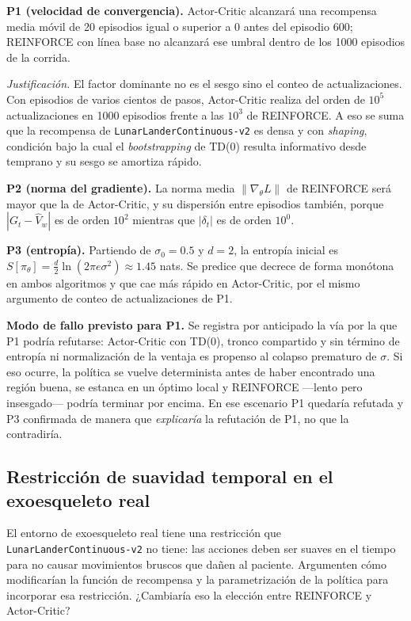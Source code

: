 \documentclass[11pt,letterpaper]{article}
\newcommand{\lead}[1]{\textbf{#1}}
\begin{document}
\begin{prediccion}
\lead{P1 (velocidad de convergencia).} Actor-Critic alcanzará una recompensa media móvil
de 20 episodios igual o superior a $0$ antes del episodio $600$; REINFORCE con línea base
no alcanzará ese umbral dentro de los 1000 episodios de la corrida.

\emph{Justificación.} El factor dominante no es el sesgo sino el conteo de
actualizaciones. Con episodios de varios cientos de pasos, Actor-Critic realiza del orden
de $10^5$ actualizaciones en 1000 episodios frente a las $10^3$ de REINFORCE. A eso se
suma que la recompensa de \texttt{LunarLanderContinuous-v2} es densa y con
\textit{shaping}, condición bajo la cual el \textit{bootstrapping} de TD(0) resulta
informativo desde temprano y su sesgo se amortiza rápido.

\medskip
\lead{P2 (norma del gradiente).} La norma media $\lVert\nabla_\theta L\rVert$ de REINFORCE
será mayor que la de Actor-Critic, y su dispersión entre episodios también, porque
$|G_t - \hat{V}_w|$ es de orden $10^2$ mientras que $|\delta_t|$ es de orden $10^0$.

\medskip
\lead{P3 (entropía).} Partiendo de $\sigma_0 = 0.5$ y $d=2$, la entropía inicial es
$S[\pi_\theta] = \tfrac{d}{2}\ln(2\pi e\sigma^2) \approx 1.45$ nats. Se predice que
decrece de forma monótona en ambos algoritmos y que cae más rápido en Actor-Critic, por
el mismo argumento de conteo de actualizaciones de P1.

\medskip
\lead{Modo de fallo previsto para P1.} Se registra por anticipado la vía por la que P1
podría refutarse: Actor-Critic con TD(0), tronco compartido y sin término de entropía ni
normalización de la ventaja es propenso al colapso prematuro de $\sigma$. Si eso ocurre,
la política se vuelve determinista antes de haber encontrado una región buena, se estanca
en un óptimo local y REINFORCE —lento pero insesgado— podría terminar por encima. En ese
escenario P1 quedaría refutada y P3 confirmada de manera que \emph{explicaría} la
refutación de P1, no que la contradiría.
\end{prediccion}

\subsection{Restricción de suavidad temporal en el exoesqueleto real}

\begin{enunciado}
El entorno de exoesqueleto real tiene una restricción que
\texttt{LunarLanderContinuous-v2} no tiene: las acciones deben ser suaves en el tiempo
para no causar movimientos bruscos que dañen al paciente. Argumenten cómo modificarían
la función de recompensa y la parametrización de la política para incorporar esa
restricción. ¿Cambiaría eso la elección entre REINFORCE y Actor-Critic?
\end{enunciado}
\end{document}
